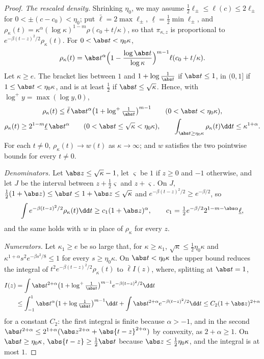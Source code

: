 \begin{refsection}
\begin{proof}
\emph{The rescaled density.} Shrinking $\eta_0$, we may assume $\frac12\ell_\pm\le\ell(c)\le2\ell_\pm$ for $0<\pm(c-c_0)<\eta_0$; put $\bar\ell=2\max\ell_\pm$, $\underline\ell=\frac12\min\ell_\pm$, and $\rho_\kappa(t)=\kappa^\alpha(\log\kappa)^{1-m}\rho(c_0+t/\kappa)$, so that $\pi_{\kappa,z}$ is proportional to $e^{-\beta(t-z)^2/2}\rho_\kappa(t)$. For $0<\abs t<\eta_0\kappa$,
\[
\rho_\kappa(t)=\abs t^\alpha\Bigl(1-\frac{\log\abs t}{\log\kappa}\Bigr)^{m-1}\ell(c_0+t/\kappa).
\]
Let $\kappa\ge e$. The bracket lies between $1$ and $1+\log\frac1{\abs t}$ if $\abs t\le1$, in $(0,1]$ if $1\le\abs t<\eta_0\kappa$, and is at least $\frac12$ if $\abs t\le\sqrt\kappa$. Hence, with $\log^+y=\max(\log y,0)$,
\begin{gather*}
\rho_\kappa(t)\le\bar\ell\,\abs t^\alpha\bigl(1+\log^+\tfrac1{\abs t}\bigr)^{m-1}\qquad(0<\abs t<\eta_0\kappa),\\
\rho_\kappa(t)\ge2^{1-m}\underline\ell\,\abs t^\alpha\qquad(0<\abs t\le\sqrt\kappa<\eta_0\kappa),\qquad
\int_{\abs t\ge\eta_0\kappa}\rho_\kappa(t)\dd t\le\kappa^{1+\alpha}.
\end{gather*}
For each $t\ne0$, $\rho_\kappa(t)\to w(t)$ as $\kappa\to\infty$; and $w$ satisfies the two pointwise bounds for every $t\ne0$.

\emph{Denominators.} Let $\abs z\le\sqrt\kappa-1$, let $\varsigma$ be $1$ if $z\ge0$ and $-1$ otherwise, and let $J$ be the interval between $z+\frac12\varsigma$ and $z+\varsigma$. On $J$, $\frac12(1+\abs z)\le\abs t\le1+\abs z\le\sqrt\kappa$ and $e^{-\beta(t-z)^2/2}\ge e^{-\beta/2}$, so
\[
\int e^{-\beta(t-z)^2/2}\rho_\kappa(t)\dd t\ge c_1(1+\abs z)^\alpha,\qquad c_1=\tfrac12e^{-\beta/2}2^{1-m-\abs\alpha}\underline\ell,
\]
and the same holds with $w$ in place of $\rho_\kappa$ for every $z$.

\emph{Numerators.} Let $\kappa_1\ge e$ be so large that, for $\kappa\ge\kappa_1$, $\sqrt\kappa\le\frac12\eta_0\kappa$ and $\kappa^{1+\alpha}s^2e^{-\beta s^2/8}\le1$ for every $s\ge\eta_0\kappa$. On $\abs t<\eta_0\kappa$ the upper bound reduces the integral of $t^2e^{-\beta(t-z)^2/2}\rho_\kappa(t)$ to $\bar\ell I(z)$, where, splitting at $\abs t=1$,
\begin{align*}
I(z)&=\int\abs t^{2+\alpha}\bigl(1+\log^+\tfrac1{\abs t}\bigr)^{m-1}e^{-\beta(t-z)^2/2}\dd t\\
&\le\int_{-1}^1\abs t^\alpha\bigl(1+\log\tfrac1{\abs t}\bigr)^{m-1}\dd t+\int\abs t^{2+\alpha}e^{-\beta(t-z)^2/2}\dd t\le C_2(1+\abs z)^{2+\alpha}
\end{align*}
for a constant $C_2$: the first integral is finite because $\alpha>-1$, and in the second $\abs t^{2+\alpha}\le2^{1+\alpha}(\abs z^{2+\alpha}+\abs{t-z}^{2+\alpha})$ by convexity, as $2+\alpha\ge1$. On $\abs t\ge\eta_0\kappa$, $\abs{t-z}\ge\frac12\abs t$ because $\abs z\le\frac12\eta_0\kappa$, and the integral is at most $1$.


\end{proof}
\end{refsection}
